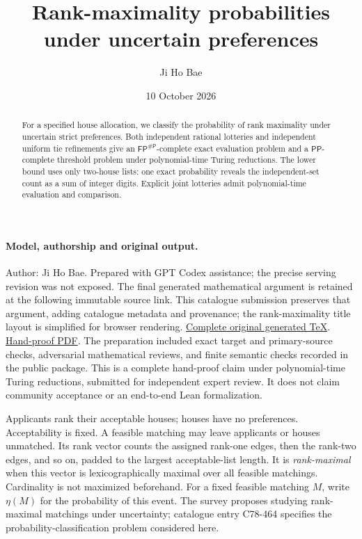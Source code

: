 \documentclass[10pt]{article}
\title{Rank-maximality probabilities under uncertain preferences}
\author{Ji Ho Bae}
\date{10 October 2026}
\newcommand{\FP}{\mathsf{FP}}
\newcommand{\PP}{\mathsf{PP}}
\newcommand{\sharpP}{\mathsf{\#P}}
\begin{document}
\maketitle

\paragraph{Model, authorship and original output.}
Author: Ji Ho Bae. Prepared with GPT Codex assistance; the precise serving
revision was not exposed. The final generated mathematical argument is
retained at the following immutable source link. This catalogue submission
preserves that argument, adding catalogue metadata and provenance; the
rank-maximality title layout is simplified for browser rendering.
\href{https://github.com/jbaelaw/rank-maximality-hand-proof-20261010/blob/e0d34b34f26033d6cef32493a65abca1480a37b2/paper/Proof.tex}{Complete original generated TeX}.
\href{https://github.com/jbaelaw/rank-maximality-hand-proof-20261010/blob/e0d34b34f26033d6cef32493a65abca1480a37b2/paper/Proof.pdf}{Hand-proof PDF}.
The preparation included exact target and primary-source checks, adversarial
mathematical reviews, and finite semantic checks recorded in the public
package. This is a complete hand-proof claim under polynomial-time Turing
reductions, submitted for independent expert review. It does not claim
community acceptance or an end-to-end Lean formalization.

\begin{abstract}
For a specified house allocation, we classify the probability of rank
maximality under uncertain strict preferences. Both independent rational
lotteries and independent uniform tie refinements give an
$\FP^{\sharpP}$-complete exact evaluation problem and a
$\PP$-complete threshold problem under polynomial-time Turing reductions.
The lower bound uses only two-house lists: one exact probability reveals
the independent-set count as a sum of integer digits. Explicit joint
lotteries admit polynomial-time evaluation and comparison.
\end{abstract}

Applicants rank their acceptable houses; houses have no preferences.
Acceptability is fixed. A feasible matching may leave applicants or houses
unmatched. Its rank vector counts the assigned rank-one edges, then the
rank-two edges, and so on, padded to the largest acceptable-list length.
It is \emph{rank-maximal} when this vector is lexicographically maximal
over all feasible matchings. Cardinality is not maximized beforehand.
For a fixed feasible matching $M$, write $\eta(M)$ for the probability
of this event. The survey \cite[\S3.1.2]{survey} proposes studying
rank-maximal matchings under uncertainty; catalogue entry C78-464
specifies the probability-classification problem considered here.
\end{document}
